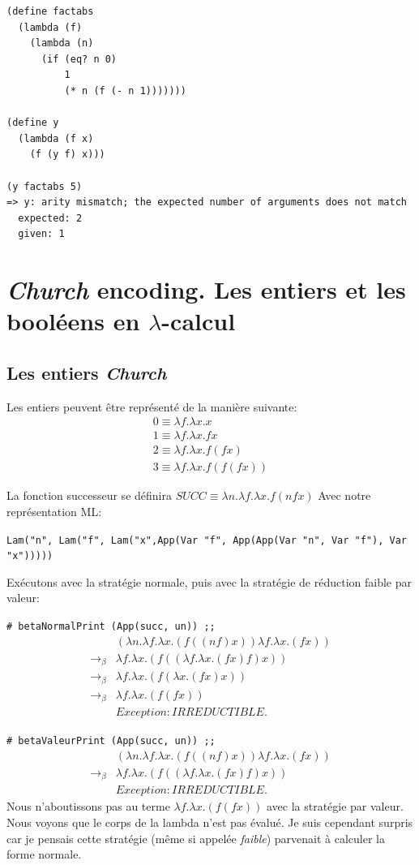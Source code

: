 \documentclass[11pt]{book}
\begin{document}
\begin{Verbatim}
(define factabs
  (lambda (f)
    (lambda (n)
      (if (eq? n 0)
          1
          (* n (f (- n 1)))))))

(define y
  (lambda (f x)
    (f (y f) x)))

(y factabs 5)
=> y: arity mismatch; the expected number of arguments does not match 
  expected: 2
  given: 1
\end{Verbatim}

\section{\textit{Church} encoding. Les entiers et les booléens en $\lambda$-calcul}
\subsection{Les entiers \textit{Church} }
Les entiers peuvent être représenté de la manière suivante:
$$
\begin{array}{l}
0 \equiv \lambda f.\lambda x.x \\
1 \equiv \lambda f.\lambda x.f x \\
2 \equiv \lambda f.\lambda x.f (f x) \\
3 \equiv \lambda f.\lambda x.f (f (f x)) 
\end{array}
$$

La fonction successeur se définira $SUCC \equiv \lambda n.\lambda f.\lambda x.f (n f x)$
Avec notre représentation ML: 

\verb+Lam("n", Lam("f", Lam("x",App(Var "f", App(App(Var "n", Var "f"), Var "x")))))+

Exécutons avec la stratégie normale, puis avec la stratégie de réduction faible par valeur:


\verb+# betaNormalPrint (App(succ, un)) ;;+
$$
\begin{array}{ll}
& (\lambda n . \lambda f . \lambda x . (f((nf)x))\lambda f . \lambda x . (fx))   \\
\rightarrow _\beta & \lambda f . \lambda x . (f((\lambda f . \lambda x . (fx)f)x))   \\
\rightarrow _\beta & \lambda f . \lambda x . (f(\lambda x . (fx)x))   \\
\rightarrow _\beta & \lambda f . \lambda x . (f(fx))   \\
& Exception: IRREDUCTIBLE.
\end{array}
$$

\verb+# betaValeurPrint (App(succ, un)) ;;+
$$
\begin{array}{ll}
& (\lambda n . \lambda f . \lambda x . (f((nf)x))\lambda f . \lambda x . (fx))   \\
\rightarrow _\beta & \lambda f . \lambda x . (f((\lambda f . \lambda x . (fx)f)x))   \\
& Exception: IRREDUCTIBLE.
\end{array} 
$$
Nous n'aboutissons pas au terme $\lambda f . \lambda x . (f(fx)) $ avec la stratégie par valeur. Nous voyons que le corps de la lambda
n'est pas évalué. Je suis cependant surpris car je pensais cette stratégie (même si appelée \textit{faible}) parvenait à calculer la
forme normale.
\end{document}
